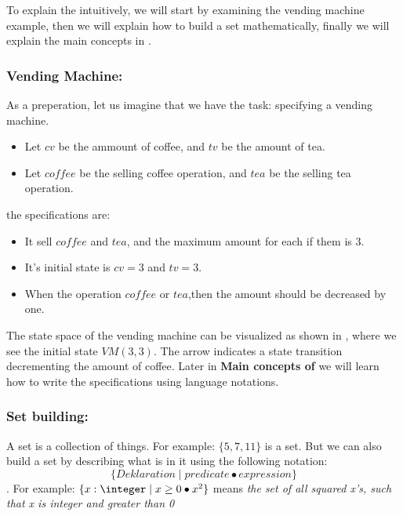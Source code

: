 To explain the \oz{} intuitively, we will start by examining the vending machine example, then we will explain how to build a set mathematically, finally we will explain the main concepts in \oz{}. 

\subsubsection{Vending Machine:}
As a preperation, let us imagine that we have the task: specifying a vending machine.
\begin{itemize}
\item Let $cv$ be the ammount of coffee, and $tv$ be the amount of tea.
\item Let $coffee$ be the selling coffee operation, and $tea$ be the selling tea operation.
\end{itemize}
the specifications are:
\begin{itemize}
\item It sell $coffee$ and $tea$, and the maximum amount for each if them is 3.
\item It's initial state is  $cv = 3$ and $tv = 3$.
\item When the operation $coffee$ or $tea$,then the amount should be decreased by one.
\end{itemize} 
The state space of the vending machine can be visualized as shown in , where we see the initial state $VM(3,3)$. The arrow indicates a state transition decrementing the amount of coffee. Later in \textbf{Main concepts of \oz{}} we will learn how to write the specifications using \oz{} language notations.


\subsubsection{Set building:} A set is a collection of things. For example: $\{5, 7, 11\}$ is a set.
But we can also build a set by describing what is in it using the following notation: \[\{Deklaration \mid predicate \bullet expression \}\].  For example: $\{x: \integer \mid x \geq 0 \bullet x^{2}\}$ means \textit{the set of all  squared x's, such that x is integer and greater than 0}

	
